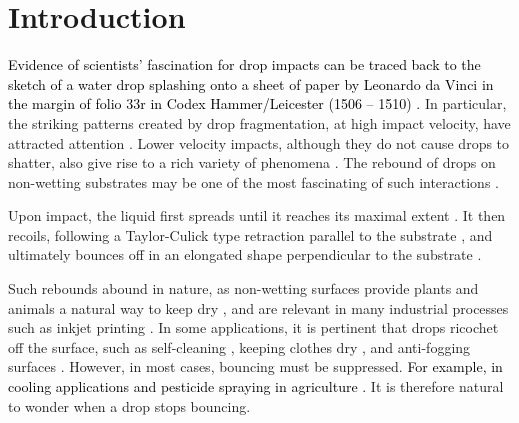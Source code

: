 \documentclass{jfm}
\newcommand{\revRev}[1]{\textcolor{black}{#1}}
\begin{document}
\section{Introduction}
\label{sec:Intro}
\revRev{Evidence of scientists' fascination for drop impacts can be traced back to the sketch of a water drop splashing onto a sheet of paper by Leonardo da Vinci in the margin of folio 33r in Codex Hammer/Leicester (1506 -- 1510) \citep{da1508notebooks}.}
In particular, the striking patterns created by drop fragmentation, at high impact velocity, have attracted attention \citep{rein1993phenomena, xu2005drop, yarin2006drop, villermaux2011drop, josserand2016drop, kim2020raindrop}. 
Lower velocity impacts, although they do not cause drops to shatter, also give rise to a rich variety of phenomena \citep{worthington1877xxviii, worthington1877second, chandra1991collision, thoroddsen2008high, yarin2006drop, josserand2016drop}.
The rebound of drops on non-wetting substrates may be one of the most fascinating of such interactions \citep{richard2000bouncing, richard2002contact, tsai2009drop, nair2014leidenfrost}.

Upon impact, the liquid first spreads \citep{Philippi2016, Gordillo2018} until it reaches its maximal extent \citep{Clanet2004,laan2014maximum,wildeman-2016-jfm,gordillo-2019-jfm}. 
It then recoils, following a Taylor-Culick type retraction parallel to the substrate \citep{taylor-1959-procrsoclonda, culick-1960-japplphys, bartolo2005retraction, pierson2020revisiting, deka-2020-prf, sanjay2022taylor}, and ultimately bounces off in an elongated shape perpendicular to the substrate \citep{richard2000bouncing, yarin2006drop, josserand2016drop}. 

Such rebounds abound in nature, as non-wetting surfaces provide plants and animals a natural way to keep dry \citep{neinhuis1997characterization, quere2008wetting}, and are relevant in many industrial processes such as inkjet printing \citep{lohse2022fundamental}. In some applications, it is pertinent that drops ricochet off the surface, such as self-cleaning \citep{blossey2003self}, keeping clothes dry \citep{liu2008hydrophobic}, and anti-fogging surfaces \citep{mouterde2017antifogging}. 
However, in most cases, bouncing must be suppressed. \revRev{For example, in cooling applications \citep{kim2007spray, shiri2017heat, jowkar2019rebounding} and pesticide spraying in agriculture \citep{bergeron2000controlling, he2021optimization, gorin2022universal}.} It is therefore natural to wonder when a drop stops bouncing.
\end{document}

